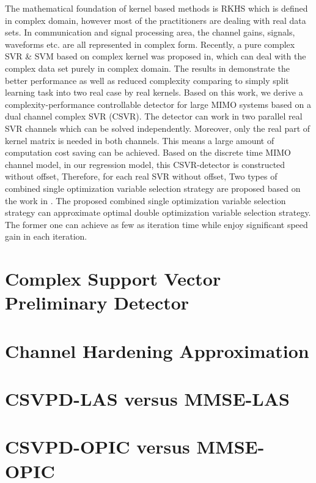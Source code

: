 The mathematical foundation of kernel based methods is RKHS which is defined in complex domain, however most of the practitioners are dealing with real data sets. In communication and signal processing area, the channel gains, signals, waveforms etc. are all represented in complex form. Recently, a pure complex SVR \& SVM based on complex kernel was proposed in\cite{bouboulis2013complex}, which can deal with the complex data set purely in complex domain. The results in\cite{bouboulis2013complex} demonstrate the better performance as well as reduced complexity comparing to simply split learning task into two real case by real kernels.  
Based on this work, we derive a complexity-performance controllable detector for large MIMO systems based on a dual channel complex SVR (CSVR). The detector can work in two parallel real SVR channels which can be solved independently. Moreover, only the real part of kernel matrix is needed in both channels. This means a large amount of computation cost saving can be achieved.
Based on the discrete time MIMO channel model, in our regression model, this CSVR-detector
is constructed without offset, Therefore, for each real SVR without offset, 
Two types of combined single optimization variable selection strategy are proposed based on the work in \cite{steinwart2011training}. The proposed combined single optimization variable selection strategy can approximate optimal double optimization variable selection strategy. The former one can achieve as few as iteration time while enjoy significant speed gain in each iteration.
\section{Complex Support Vector Preliminary Detector}
\section{Channel Hardening Approximation}
\section{CSVPD-LAS versus MMSE-LAS}
\section{CSVPD-OPIC versus MMSE-OPIC}

